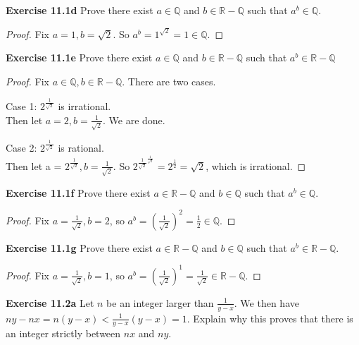 \documentclass[12pt,oneside]{article}
\newenvironment{exercise}[1]{\vspace{.1in}\noindent\textbf{Exercise #1 \hspace{.05em}}}{}
\newcommand{\R}{\mathbb{R}}
\newcommand{\Q}{\mathbb{Q}}
\begin{document}
\begin{exercise}{11.1d}
Prove there exist $a \in \Q$ and $b \in \R - \Q$ such that $a^b \in \Q$.
\end{exercise}

\begin{proof}
Fix $a=1, b = \sqrt{2}$. So $a^{b}=1^{\sqrt{2}}=1 \in \Q$.
\end{proof}

\begin{exercise}{11.1e}
Prove there exist $a \in \Q$ and $b \in \R - \Q$ such that $a^b \in \R - \Q$
\end{exercise}

\begin{proof}
Fix $a \in \Q, b \in \R-\Q$. There are two cases.

Case 1: $2^{\frac{1}{\sqrt{2}}}$ is irrational.\\
Then let $a=2, b = \frac{1}{\sqrt{2}}$. We are done.

Case 2: $2^{\frac{1}{\sqrt{2}}}$ is rational.\\
Then let a = $2^{\frac{1}{\sqrt{2}}}, b=\frac{1}{\sqrt{2}}$. So $2^{\frac{1}{\sqrt{2}}^{\frac{1}{\sqrt{2}}}} = 2^{\frac{1}{2}} = \sqrt{2}$, which is irrational.
\end{proof}

\begin{exercise}{11.1f}
Prove there exist $a \in \R-\Q$ and $b \in \Q$ such that $a^b \in \Q$.
\end{exercise}

\begin{proof}
Fix $a= \frac{1}{\sqrt{2}}, b=2$, so $a^b=(\frac{1}{\sqrt{2}})^2 = \frac{1}{2} \in \Q$.
\end{proof}

\begin{exercise}{11.1g}
Prove there exist $a \in \R-\Q$ and $b \in \Q$ such that $a^b \in \R-\Q$.
\end{exercise}

\begin{proof}
Fix $a=\frac{1}{\sqrt{2}}, b=1$, so $a^b=(\frac{1}{\sqrt{2}})^1= \frac{1}{\sqrt{2}} \in \R-\Q$.
\end{proof}

\begin{exercise}{11.2a}
Let $n$ be an integer larger than $\frac{1}{y-x}$. We then have $ny-nx=n(y-x) < \frac{1}{y-x}(y-x)=1$. Explain why this proves that there is an integer strictly between $nx$ and $ny$.
\end{exercise}
\end{document}
